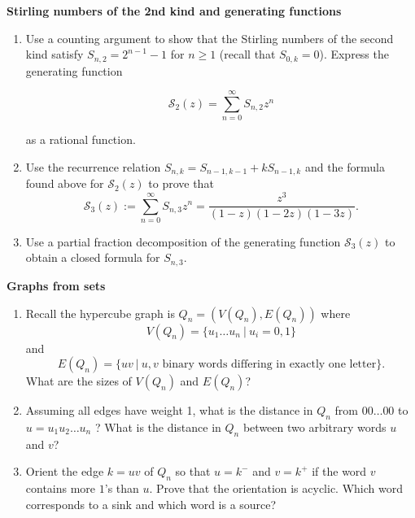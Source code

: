 \documentclass[12pt,
               a4paper,
               article,
               oneside,
               oldfontcommands,
               UKenglish]{memoir}
\begin{document}
\begin{problem}
{\bf Stirling numbers of the 2nd kind and generating functions}

\begin{enumerate}
\item Use a counting argument to show that  the Stirling numbers of the second kind satisfy $S_{n, 2} = 2^{n-1} -1$ for $n\geq 1$ (recall  that $S_{0, k} = 0$). Express the generating function

$$\mathcal{S}_2(z) = \sum_{n = 0}^\infty S_{n, 2} z^n$$

as a rational function.

\item Use the recurrence relation $S_{n, k} = S_{n-1, k-1} + k S_{n-1, k}$  and the formula found above for
$\mathcal{S}_2(z) $ to
prove that $$\mathcal{S}_3(z) := \sum_{n = 0}^\infty S_{n, 3} z^n =  \frac{z^3}{(1-z)(1-2z)(1-3z)}.$$

\item Use a partial fraction decomposition of the generating function $\mathcal{S}_3(z) $ to obtain a closed formula for $S_{n, 3}$.
\end{enumerate}



\end{problem}


\begin{problem}{\bf Graphs from sets}

\begin{enumerate}

\item Recall the hypercube graph is $Q_n = (V(Q_n), E(Q_n))$ where
$$V(Q_n) = \{ u_1 \dots u_n \ | \ u_i = 0, 1 \}$$
and
$$E(Q_n) = \{ uv \ | \ u, v \text{ binary words differing in exactly one letter} \}.$$
What are the sizes of $V(Q_n)$ and $E(Q_n)$?

\item Assuming all edges have weight 1, what is the distance in $Q_n$ from $00\dots00$ to $u = u_1u_2 \dots u_n$ ?
What is the distance in $Q_n$ between two arbitrary words $u$ and $v$?

\item Orient the edge $k = uv$  of $Q_n$ so that  $u = k^-$ and $v = k^+$ if the word $v$ contains more $1$'s  than $u$.
Prove that the orientation is acyclic. Which word corresponds to a sink and which word is a source?


\end{enumerate}


\end{problem}
\end{document}
